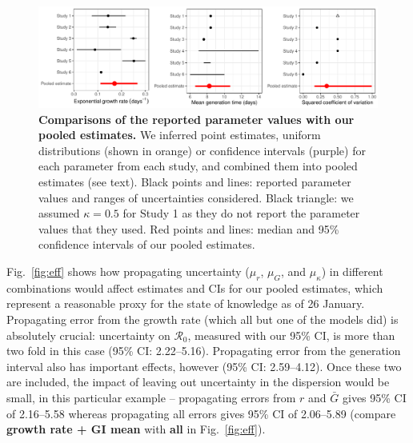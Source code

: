 \documentclass[12pt]{article}
\newcommand{\fref}[1]{Fig.~\ref{fig:#1}}
\newcommand{\Rx}[1]{\ensuremath{{\mathcal R}_{#1}}}
\newcommand{\Ro}{\Rx{0}\xspace}
\begin{document}
\begin{figure}[t]
\includegraphics[width=\textwidth]{compare_assumption.pdf}
\caption{
\textbf{Comparisons of the reported parameter values with our pooled estimates.}
We inferred point estimates, uniform distributions (shown in orange) or confidence intervals (purple) for each parameter from each study, and combined them into pooled estimates (see text).
Black points and lines: reported parameter values and ranges of uncertainties considered.
Black triangle: we assumed $\kappa=0.5$ for Study 1 as they do not report the parameter values that they used.
Red points and lines: median and 95\% confidence intervals of our pooled estimates.
}
\label{fig:assumption}
\end{figure}

\fref{eff} shows how propagating uncertainty ($\mu_r$, $\mu_G$, and $\mu_\kappa$) in different combinations would affect estimates and CIs for our pooled estimates, which represent a reasonable proxy for the state of knowledge as of 26 January. 
Propagating error from the growth rate (which all but one of the models did) is absolutely crucial:
uncertainty on \Ro, measured with our 95\% CI, is more than two fold in this case (95\% CI: 2.22--5.16).
Propagating error from the generation interval also has important effects, however (95\% CI: 2.59--4.12).
Once these two are included, the impact of leaving out uncertainty in the dispersion would be small, in this particular example -- 
propagating errors from $r$ and $\bar G$ gives 95\% CI of 2.16--5.58 whereas propagating all errors gives 95\% CI of 2.06--5.89 (compare \textbf{growth rate + GI mean} with \textbf{all} in \fref{eff}).
\end{document}
